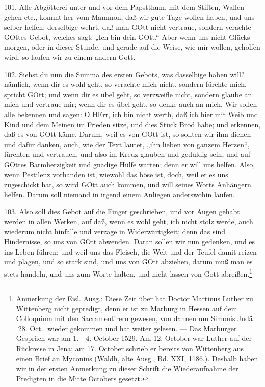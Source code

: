 101. Alle Abgötterei unter und vor dem Papstthum, mit dem Stiften, Wallen gehen etc., kommt her vom Mammon, daß wir gute Tage wollen haben, und uns selber helfen; derselbige wehrt, daß man GOtt nicht vertraue, sondern verachte GOttes Gebot, welches sagt: „Ich bin dein GOtt.“ Aber wenn uns nicht Glücks morgen, oder in dieser Stunde, und gerade auf die Weise, wie mir wollen, geholfen wird, so laufen wir zu einem andern Gott.

102. Siehst du nun die Summa des ersten Gebots, was dasselbige haben will? nämlich, wenn dir es wohl geht, so verachte mich nicht, sondern fürchte mich, spricht GOtt; und wenn dir es übel geht, so verzweifle nicht, sondern glaube an mich und vertraue mir; wenn dir es übel geht, so denke auch an mich. Wir sollen alle bekennen und sagen: O HErr, ich bin nicht werth, daß ich hier mit Weib und Kind und dem Meinen im Frieden sitze, und dies Stück Brod habe; und erkennen, daß es von GOtt käme. Darum, weil es von GOtt ist, so sollten wir ihm dienen und dafür danken, auch, wie der Text lautet, „ihn lieben von ganzem Herzen“, fürchten und vertrauen, und also im Kreuz glauben und geduldig sein, und auf GOttes Barmherzigkeit und gnädige Hülfe warten; denn er will uns helfen. Also, wenn Pestilenz vorhanden ist, wiewohl das böse ist, doch, weil er es uns zugeschickt hat, so wird GOtt auch kommen, und will seines Worts Anhängern helfen. Darum soll niemand in irgend einem Anliegen anderswohin laufen.

103. Also soll dies Gebot auf die Finger geschrieben, und vor Augen gehabt werden in allen Werken, auf daß, wenn es wohl geht, ich nicht stolz werde, auch wiederum nicht hinfalle und verzage in Widerwärtigkeit; denn das sind Hindernisse, so uns von GOtt abwenden. Daran sollen wir nun gedenken, und es ins Leben führen; und weil uns das Fleisch, die Welt und der Teufel damit reizen und plagen, und so stark sind, und uns von GOtt abziehen, darum muß man es stets handeln, und uns zum Worte halten, und nicht lassen von Gott abreißen.\footnote{Anmerkung der Eisl. Ausg.: Diese Zeit über hat Doctor Martinus Luther zu Wittenberg nicht gepredigt, denn er ist zu Marburg in Hessen auf dem Colloquium mit den Sacramentirern gewesen, von dannen um Simonis Judä [28. Oct.] wieder gekommen und hat weiter gelesen. — Das Marburger Gespräch war am 1.—4. October 1529. Am 12. October war Luther auf der Rückreise in Jena; am 17. October schrieb er bereits von Wittenberg aus einen Brief an Myconius (Waldh, alte Ausg., Bd. XXI, 1186.). Deshalb haben wir in der ersten Anmerkung zu dieser Schrift die Wiederaufnahme der Predigten in die Mitte Octobers gesetzt.}

